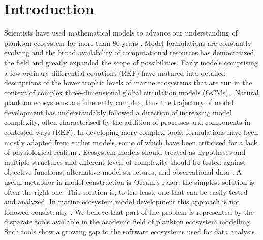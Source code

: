 \documentclass[journal abbreviation, manuscript]{copernicus}
\begin{document}

\section{Introduction}


Scientists have used mathematical models to advance our understanding of plankton ecosystem for more than 80 years \citep{Gentleman2002a}. Model formulations are constantly evolving and the broad availability of computational resources has democratized the field and greatly expanded the scope of possibilities. Early models comprising a few ordinary differential equations (REF) have matured into detailed descriptions of the lower trophic levels of marine ecosystems that are run in the context of complex three-dimensional global circulation models (GCMs) \citep[e.g.][]{Dutkiewicz2020DimensionsDiversity}. Natural plankton ecosystems are inherently complex, thus the trajectory of model development has understandably followed a direction of increasing model complexity, often characterised by the addition of processes and components in contested ways (REF). In developing more complex tools, formulations have been mostly adapted from earlier models, some of which have been criticised for a lack of physiological realism \citep{Smith2014}. Ecosystem models should treated as hypotheses and multiple structures and different levels of complexity should be tested against objective functions, alternative model structures, and observational data \citep{Franks2009}. A useful metaphor in model construction is Occam's razor: the simplest solution is often the right one. This solution is, to the least, one that can be easily tested and analyzed. In marine ecosystem model development this approach is not followed consistently \citep{Shimoda2016}.
We believe that part of the problem is represented by the disparate tools available in the academic field of plankton ecosystem modelling. Such tools show a growing gap to the software ecosystems used for data analysis. 
\end{document}
